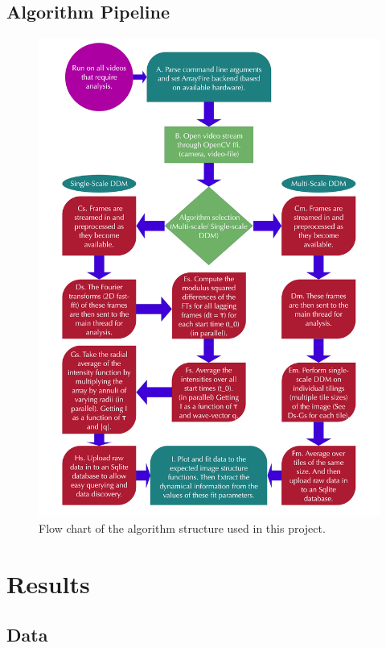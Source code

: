\documentclass[11pt]{article}
\begin{document}
\subsection{Algorithm Pipeline}
\begin{figure}[H]
\centering
\noindent \includegraphics[height=0.7\paperwidth, width=0.6\paperwidth]{images/algo-pipeline.png}
\caption{Flow chart of the algorithm structure used in this project.}
\end{figure}
 
\clearpage
\section{Results}
\subsection{Data}
\end{document}
